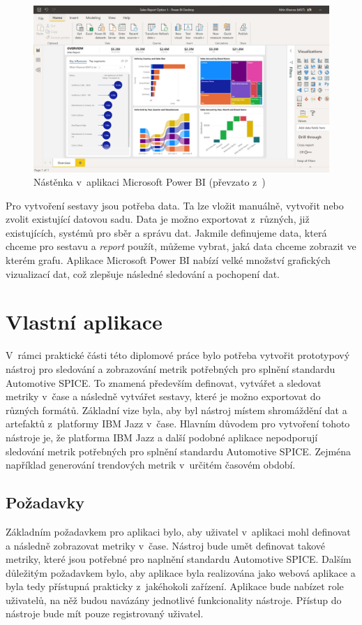 \documentclass[czech,master]{diploma}
\begin{document}
\begin{figure}[!ht]
    \centering
    \includegraphics[width=1\textwidth]{Diplomka/Figures/powerbi-dashboard.jpg}
    \caption{Nástěnka v~aplikaci Microsoft Power BI (převzato z~\cite{ref:microsoft_bi_general})}
    \label{fig:powerbi_dashboard}
\end{figure}

Pro vytvoření sestavy jsou potřeba data. Ta lze vložit manuálně, vytvořit nebo zvolit existující datovou sadu. Data je možno exportovat z~různých, již existujících, systémů pro sběr a správu dat. Jakmile definujeme data, která chceme pro sestavu a \textit{report} použít, můžeme vybrat, jaká data chceme zobrazit ve kterém grafu. Aplikace Microsoft Power BI nabízí velké množství grafických vizualizací dat, což zlepšuje následné sledování a pochopení dat.


\chapter{Vlastní aplikace}
\label{sec:my_app}
V~rámci  praktické části této diplomové práce bylo potřeba vytvořit  prototypový nástroj pro sledování a zobrazování metrik potřebných pro splnění standardu Automotive SPICE. To znamená především definovat, vytvářet a sledovat metriky v~čase a následně vytvářet sestavy, které je možno exportovat do různých formátů. Základní vize byla, aby byl nástroj místem shromáždění dat a artefaktů z~platformy IBM Jazz v~čase. Hlavním důvodem pro vytvoření tohoto nástroje je, že platforma IBM Jazz a další podobné aplikace nepodporují sledování metrik potřebných pro splnění standardu Automotive SPICE. Zejména například generování trendových metrik v~určitém časovém období.

\section{Požadavky}
\label{sec:requirements}
Základním požadavkem pro aplikaci bylo, aby uživatel v~aplikaci mohl definovat a následně zobrazovat metriky v~čase. Nástroj bude umět definovat takové metriky, které jsou potřebné pro naplnění standardu Automotive SPICE. Dalším důležitým požadavkem bylo, aby aplikace byla realizována jako webová aplikace a byla tedy přístupná prakticky z~jakéhokoli zařízení. Aplikace bude nabízet role uživatelů, na něž budou navázány jednotlivé funkcionality nástroje. Přístup do nástroje bude mít pouze registrovaný uživatel.
\end{document}
